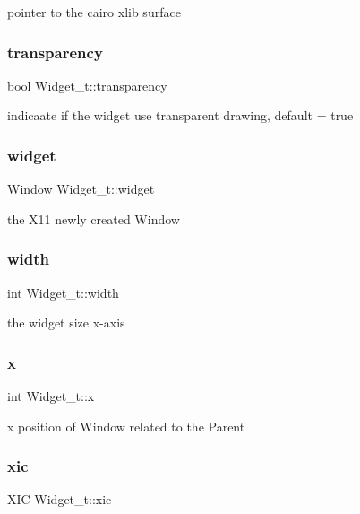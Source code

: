 pointer to the cairo xlib surface \mbox{\label{structWidget__t_a42a597c21eca964c0296fc7026feb43b}} 
\subsubsection{\texorpdfstring{transparency}{transparency}}
{\footnotesize\ttfamily bool Widget\+\_\+t\+::transparency}

indicaate if the widget use transparent drawing, default = true \mbox{\label{structWidget__t_acb2bfb41674371ee1220a9d6a2d89fb1}} 
\subsubsection{\texorpdfstring{widget}{widget}}
{\footnotesize\ttfamily Window Widget\+\_\+t\+::widget}

the X11 newly created Window \mbox{\label{structWidget__t_a3204c88196ed5793250b3530dd719037}} 
\subsubsection{\texorpdfstring{width}{width}}
{\footnotesize\ttfamily int Widget\+\_\+t\+::width}

the widget size x-\/axis \mbox{\label{structWidget__t_aac6ce7621b682bb4ce88bac9181c34a7}} 
\subsubsection{\texorpdfstring{x}{x}}
{\footnotesize\ttfamily int Widget\+\_\+t\+::x}

x position of Window related to the Parent \mbox{\label{structWidget__t_adafb1b98ea551ef726be6c726ac2e817}} 
\subsubsection{\texorpdfstring{xic}{xic}}
{\footnotesize\ttfamily X\+IC Widget\+\_\+t\+::xic}

